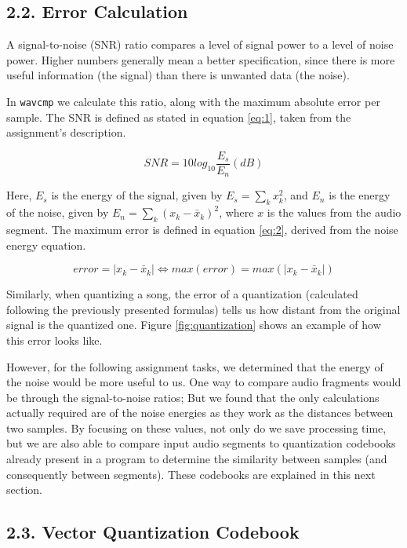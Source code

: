 \documentclass[12pt]{article}
\begin{document}
\newpage
\subsection*{2.2. Error Calculation}

A signal-to-noise (SNR) ratio compares a level of signal power to a level of 
noise power. 
Higher numbers generally mean a better specification, since there is more useful 
information (the signal) than there is unwanted data (the noise).

In \texttt{wavcmp} we calculate this ratio, along with the maximum absolute 
error per sample. The SNR is defined as stated in equation \ref{eq:1}, taken 
from the assignment's description.

\begin{equation} \label{eq:1}
  SNR = 10 log_{10} \frac{E_{s}}{E_{n}} (dB)
\end{equation}

Here, $E_s$ is the energy of the signal, given by $E_s = \sum_{k} x_k^2$, and
$E_n$ is the energy of the noise, given by $E_n = \sum_{k} (x_k-\bar{x}_k)^2$,
where $x$ is the values from the audio segment.
The maximum error is defined in equation \ref{eq:2}, derived from the noise 
energy equation.

\begin{equation} \label{eq:2}
  error = |x_k-\bar{x}_k| \Leftrightarrow 
  max(error) = max(|x_k-\bar{x}_k|)
\end{equation}

Similarly, when quantizing a song, the error of a quantization (calculated following the previously presented formulas) tells us how distant from the original
signal is the quantized one.
Figure \ref{fig:quantization} shows an example of how this error looks like.

However, for the following assignment tasks, we determined that the energy of
the noise would be more useful to us.
One way to compare audio fragments would be through the signal-to-noise ratios;
But we found that the only calculations actually required are of the noise 
energies as they work as the distances between two samples.
By focusing on these values, not only do we save processing time, but we are
also able to compare input audio segments to quantization codebooks already 
present in a program to determine the similarity between samples (and 
consequently between segments). These codebooks are explained in this next section.

\subsection*{2.3. Vector Quantization Codebook}
\label{sec:vctQuantCB}
\end{document}

